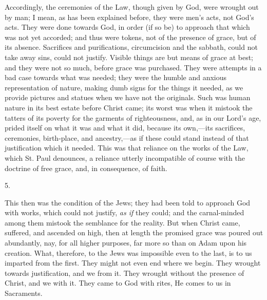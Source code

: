 Accordingly, the ceremonies of the Law, though given by God, were
wrought out by man; I mean, as has been explained before, they were
men's acts, not God's acts. They were done towards God, in order (if
so be) to approach that which was not yet accorded; and thus were
tokens, not of the presence of grace, but of its absence. Sacrifices
and purifications, circumcision and the sabbath, could not take away
sins, could not justify. Visible things are but means of grace at
best; and they were not so much, before grace was purchased. They were
attempts in a bad case towards what was needed; they were the humble
and anxious representation of nature, making dumb signs for the things
it needed, as we provide pictures and statues when we have not the
originals. Such was human nature in its best estate before
Christ came; its worst was when it mistook the tatters of its poverty
for the garments of righteousness, and, as in our Lord's age, prided
itself on what it was and what it did, because its own,—its
sacrifices, ceremonies, birth-place, and ancestry,—as if these could
stand instead of that justification which it needed. This was that
reliance on the works of the Law, which St. Paul denounces, a reliance
utterly incompatible of course with the doctrine of free grace, and,
in consequence, of faith.

5.

This then was the condition of the Jews; they had been told to
approach God with works, which could not justify, \emph{as if} they could;
and the carnal-minded among them mistook the semblance for the
reality. But when Christ came, suffered, and ascended on high, then at
length the promised grace was poured out abundantly, nay, for all
higher purposes, far more so than on Adam upon his creation. What,
therefore, to the Jews was impossible even to the last, is to us
imparted from the first. They might not even end where we begin. They
wrought towards justification, and we from it. They wrought without
the presence of Christ, and we with it. They came to God with rites,
He comes to us in Sacraments.

